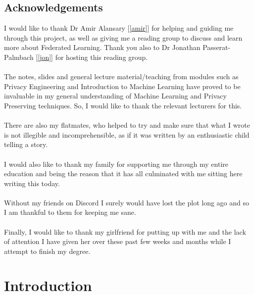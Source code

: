 \documentclass[12pt,twoside]{report}
\begin{document}
\section*{Acknowledgements}
I would like to thank Dr Amir Alansary [\ref{amir}] for helping and guiding me through this project, as well as giving me a reading group to discuss and learn more about Federated Learning. 
Thank you also to Dr Jonathan Passerat-Palmbach [\ref{jon}] for hosting this reading group.
\\ \\
The notes, slides and general lecture material/teaching from modules such as Privacy Engineering and Introduction to Machine Learning have proved to be invaluable in my general understanding of Machine Learning and Privacy Preserving techniques. So, I would like to thank the relevant lecturers for this.
\\ \\
There are also my flatmates, who helped to try and make sure that what I wrote is not illegible and incomprehensible, as if it was written by an enthusiastic child telling a story.
\\ \\
I would also like to thank my family for supporting me through my entire education and being the reason that it has all culminated with me sitting here writing this today.
\\ \\
Without my friends on Discord I surely would have lost the plot long ago and so I am thankful to them for keeping me sane.
\\ \\
Finally, I would like to thank my girlfriend for putting up with me and the lack of attention I have given her over these past few weeks and months while I attempt to finish my degree.

\clearpage{\pagestyle{empty}}

\tableofcontents 


\clearpage{\pagestyle{empty}}
\setcounter{page}{1}
\fancyhead[LE,RO]{\slshape \rightmark}
\fancyhead[LO,RE]{\slshape \leftmark}

\chapter{Introduction}

\end{document}
